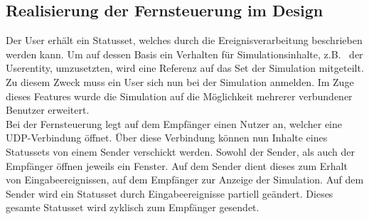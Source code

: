 \subsection{Realisierung der Fernsteuerung im Design}
Der User erhält ein Statusset, welches durch die Ereignisverarbeitung beschrieben werden kann.
Um auf dessen Basis ein Verhalten für Simulationsinhalte, z.B.~ der Userentity, umzusetzten, wird eine Referenz auf das Set der Simulation mitgeteilt. Zu diesem Zweck muss ein User sich nun bei der Simulation anmelden. Im Zuge dieses Features wurde die Simulation auf die Möglichkeit mehrerer verbundener Benutzer erweitert.\\
Bei der Fernsteuerung legt auf dem Empfänger einen Nutzer an, welcher eine UDP-Verbindung öffnet. Über diese Verbindung können nun Inhalte eines Statussets von einem Sender verschickt werden.
Sowohl der Sender, als auch der Empfänger öffnen jeweils ein Fenster. Auf dem Sender dient dieses zum Erhalt von Eingabeereignissen, auf dem Empfänger zur Anzeige der Simulation. Auf dem Sender wird ein Statusset durch Eingabeereignisse partiell geändert. Dieses gesamte Statusset wird zyklisch zum Empfänger gesendet.
